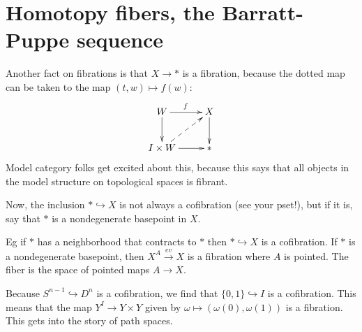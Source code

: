 \section{Homotopy fibers, the Barratt-Puppe sequence}
Another fact on fibrations is that $X\to \ast$ is a fibration, because the dotted map can be taken to the map $(t,w)\mapsto f(w)$:
\begin{equation*}
    \xymatrix{
    W\ar[d]\ar[r]^f & X\ar[d]\\
    I\times W\ar@{-->}[ur]\ar[r] & \ast
}
\end{equation*}
Model category folks get excited about this, because this says that all objects in the model structure on topological spaces is fibrant. 
\begin{definition}
Now, the inclusion $\ast\hookrightarrow X$ is not always a cofibration (see your pset!), but if it is, say that $\ast$ is a nondegenerate basepoint in $X$.
\end{definition}
Eg if $\ast$ has a neighborhood that contracts to $\ast$ then $\ast\hookrightarrow X$ is a cofibration. If $\ast$ is a nondegenerate basepoint, then $X^A\xrightarrow{ev} X$ is a fibration where $A$ is pointed. The fiber is the space of pointed maps $A\to X$.

Because $S^{n-1}\hookrightarrow D^n$ is a cofibration, we find that $\{0,1\}\hookrightarrow I$ is a cofibration. This means that the map $Y^I\to Y\times Y$ given by $\omega\mapsto (\omega(0),\omega(1))$ is a fibration. This gets into the story of path spaces.

